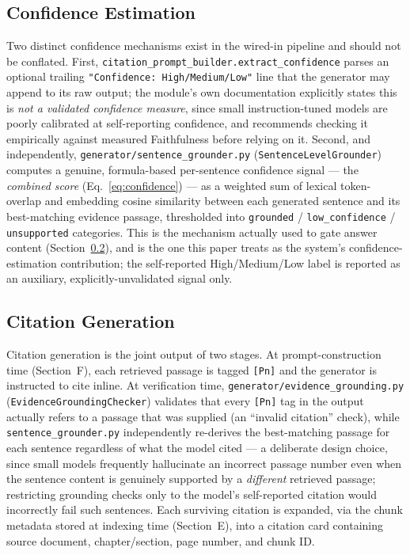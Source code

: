 \documentclass[conference]{IEEEtran}
\begin{document}
\subsection{Confidence Estimation}
Two distinct confidence mechanisms exist in the wired-in pipeline and should not be conflated. First, \texttt{citation\_prompt\_builder.extract\_confidence} parses an optional trailing \texttt{"Confidence: High/Medium/Low"} line that the generator may append to its raw output; the module's own documentation explicitly states this is \emph{not a validated confidence measure}, since small instruction-tuned models are poorly calibrated at self-reporting confidence, and recommends checking it empirically against measured Faithfulness before relying on it. Second, and independently, \texttt{generator/sentence\_grounder.py} (\texttt{SentenceLevelGrounder}) computes a genuine, formula-based per-sentence confidence signal — the \emph{combined score} (Eq.~\ref{eq:confidence}) — as a weighted sum of lexical token-overlap and embedding cosine similarity between each generated sentence and its best-matching evidence passage, thresholded into \texttt{grounded} / \texttt{low\_confidence} / \texttt{unsupported} categories. This is the mechanism actually used to gate answer content (Section~\ref{sec:citation-gen}), and is the one this paper treats as the system's confidence-estimation contribution; the self-reported High/Medium/Low label is reported as an auxiliary, explicitly-unvalidated signal only.

\subsection{Citation Generation}
\label{sec:citation-gen}
Citation generation is the joint output of two stages. At prompt-construction time (Section~F), each retrieved passage is tagged \texttt{[Pn]} and the generator is instructed to cite inline. At verification time, \texttt{generator/evidence\_grounding.py} (\texttt{EvidenceGroundingChecker}) validates that every \texttt{[Pn]} tag in the output actually refers to a passage that was supplied (an ``invalid citation'' check), while \texttt{sentence\_grounder.py} independently re-derives the best-matching passage for each sentence regardless of what the model cited — a deliberate design choice, since small models frequently hallucinate an incorrect passage number even when the sentence content is genuinely supported by a \emph{different} retrieved passage; restricting grounding checks only to the model's self-reported citation would incorrectly fail such sentences. Each surviving citation is expanded, via the chunk metadata stored at indexing time (Section~E), into a citation card containing source document, chapter/section, page number, and chunk ID.
\end{document}
